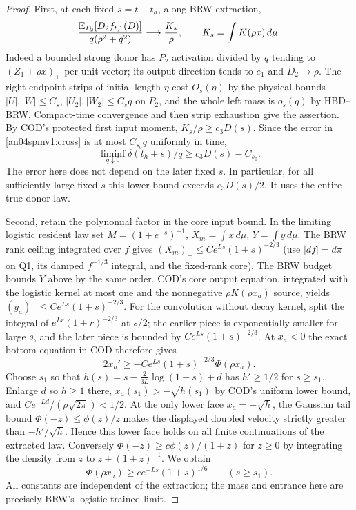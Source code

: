 \documentclass[11pt]{article}
\begin{document}
\begin{proof}
First, at each fixed $s=t-t_h$, along BRW extraction,
\[
 \frac{\mathbb E_{P_2}[D_2 f_{t,1}(D)]}{q(\rho^2+q^2)}
       \longrightarrow \frac{K_s}{\rho},
 \qquad K_s=\int K(\rho x)\,d\mu .
\]
Indeed a bounded strong donor has $P_2$ activation divided by $q$
tending to $(Z_1+\rho x)_+$ per unit vector; its output direction
tends to $e_1$ and $D_2\to\rho$. The right endpoint strips
of initial length $\eta$ cost $O_s(\eta)$ by the physical bounds
$|U|,|W|\le C_s$, $|U_2|,|W_2|\le C_s q$ on $P_2$, and the whole
left mass is $o_s(q)$ by HBD--BRW. Compact-time convergence and
then strip exhaustion give the assertion. By COD's protected first
input moment, $K_s/\rho\ge c_3D(s)$. Since the error in
\eqref{an04spmv1:cross} is at most $C_{s_0}q$ uniformly in time,
\[
 \liminf_{q\downarrow0}\delta(t_h+s)/q\ge c_3D(s)-C_{s_0}.
\]
The error here does not depend on the later fixed $s$. In particular,
for all sufficiently large fixed $s$ this lower bound exceeds
$c_3D(s)/2$. It uses the entire true donor law.

Second, retain the polynomial factor in the core input bound.
In the limiting logistic resident law set $M=(1+e^{-s})^{-1}$,
$X_m=\int x\,d\mu$, $Y=\int y\,d\mu$. The BRW rank ceiling
integrated over $f$ gives
$(X_m)_+\le C e^{Ls}(1+s)^{-2/3}$ (use $|df|=d\pi$ on Q1,
its damped $f^{-1/3}$ integral, and the fixed-rank core). The BRW
budget bounds $Y$ above by the same order. COD's core output
equation, integrated with the logistic kernel at most one and the
nonnegative $\rho K(\rho x_a)$ source, yields
$(y_a)_-\le C e^{Ls}(1+s)^{-2/3}$. For the convolution without
decay kernel, split the integral of $e^{Lr}(1+r)^{-2/3}$ at $s/2$;
the earlier piece is exponentially smaller for large $s$, and the
later piece is bounded by $C e^{Ls}(1+s)^{-2/3}$.
At $x_a<0$ the exact bottom equation in COD therefore gives
\[
 2x_a'\ge -C e^{Ls}(1+s)^{-2/3}\Phi(\rho x_a).
\]
Choose $s_1$ so that $h(s)=s-\frac{2}{3L}\log(1+s)+d$
has $h'\ge1/2$ for $s\ge s_1$. Enlarge $d$ so $h\ge1$ there,
$x_a(s_1)>-\sqrt{h(s_1)}$ by COD's uniform lower bound, and
$C e^{-Ld}/(\rho\sqrt{2\pi})<1/2$. At the only lower face
$x_a=-\sqrt h$, the Gaussian tail bound
$\Phi(-z)\le\phi(z)/z$ makes the displayed doubled velocity
strictly greater than $-h'/\sqrt h$. Hence this lower face holds
on all finite continuations of the extracted law. Conversely
$\Phi(-z)\ge c\phi(z)/(1+z)$ for $z\ge0$ by integrating the
density from $z$ to $z+(1+z)^{-1}$. We obtain
\[
 \Phi(\rho x_a)\ge c e^{-Ls}(1+s)^{1/6}\qquad(s\ge s_1).
\]
All constants are independent of the extraction; the mass and
entrance here are precisely BRW's logistic trained limit.


\end{proof}
\end{document}
